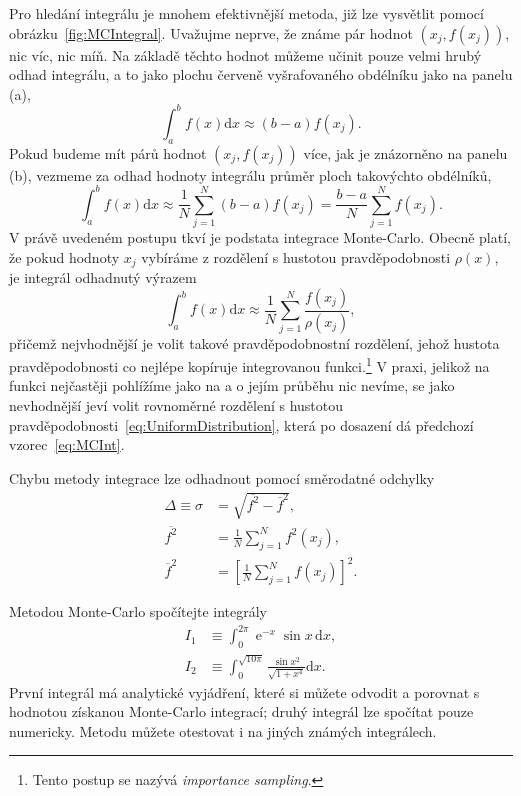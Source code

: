 \documentclass[a4paper,11pt,twoside]{article}
\DeclareMathOperator{\e}{e}             %
\renewcommand{\d}{\mathrm{d}}           %
\theoremstyle{red}
\theoremstyle{green}
\begin{document}
    Pro hledání integrálu je mnohem efektivnější metoda, již lze vysvětlit pomocí obrázku~\ref{fig:MCIntegral}.
    Uvažujme neprve, že známe pár hodnot $(x_{j},f(x_{j}))$, nic víc, nic míň.
    Na základě těchto hodnot můžeme učinit pouze velmi hrubý odhad integrálu, a to jako plochu červeně vyšrafovaného obdélníku jako na panelu (a),
    \begin{equation}
        \int_{a}^{b}f(x)\d x\approx (b-a)f(x_{j}).
    \end{equation}
    Pokud budeme mít párů hodnot $(x_{j},f(x_{j}))$ více, jak je znázorněno na panelu (b), vezmeme za odhad hodnoty integrálu průměr ploch takovýchto obdélníků,
    \begin{equation}
        \label{eq:MCInt}
        \int_{a}^{b}f(x)\d x
            \approx \frac{1}{N}\sum_{j=1}^{N}(b-a)f(x_{j})
            =\frac{b-a}{N}\sum_{j=1}^{N}f(x_{j}).
    \end{equation}
    V právě uvedeném postupu tkví je podstata integrace Monte-Carlo.
    Obecně platí, že pokud hodnoty $x_{j}$ vybíráme z rozdělení s hustotou pravděpodobnosti $\rho(x)$, je integrál odhadnutý výrazem
    \begin{equation}
        \int_{a}^{b}f(x)\d x
            \approx\frac{1}{N}\sum_{j=1}^{N}\frac{f(x_{j})}{\rho(x_{j})},
    \end{equation} 
    přičemž nejvhodnější je volit takové pravděpodobnostní rozdělení, jehož hustota pravděpodobnosti co nejlépe kopíruje integrovanou funkci.\footnote{
        Tento postup se nazývá \emph{importance sampling}.
    }
    V praxi, jelikož na funkci nejčastěji pohlížíme jako na  a o jejím průběhu nic nevíme, se jako nevhodnější jeví volit rovnoměrné rozdělení s hustotou pravděpodobnosti~\eqref{eq:UniformDistribution}, která po dosazení dá předchozí vzorec~\eqref{eq:MCInt}.

    Chybu metody integrace lze odhadnout pomocí směrodatné odchylky
    \begin{align}
        \Delta\equiv\sigma&=\sqrt{\overline{f^{2}}-\overline{f}^{2}},\\
        \overline{f^{2}}&=\frac{1}{N}\sum_{j=1}^{N}f^{2}(x_{j}),\nonumber\\
        \overline{f}^{2}&=\left[\frac{1}{N}\sum_{j=1}^{N}f(x_{j})\right]^{2}.\nonumber
    \end{align}

    \begin{solved}
        Metodou Monte-Carlo spočítejte integrály
        \begin{align}
            I_{1}&\equiv\int_{0}^{2\pi}\e^{-x}\sin{x}\,\d x,
            \label{eq:I1}\\
            I_{2}&\equiv\int_{0}^{\sqrt{10\pi}}\frac{\sin{x^{2}}}{\sqrt{1+x^{4}}}\d x.
        \end{align}
        První integrál má analytické vyjádření, které si můžete odvodit a porovnat s hodnotou získanou Monte-Carlo integrací; druhý integrál lze spočítat pouze numericky.
        Metodu můžete otestovat i na jiných známých integrálech.
    \end{solved}
\end{document}
